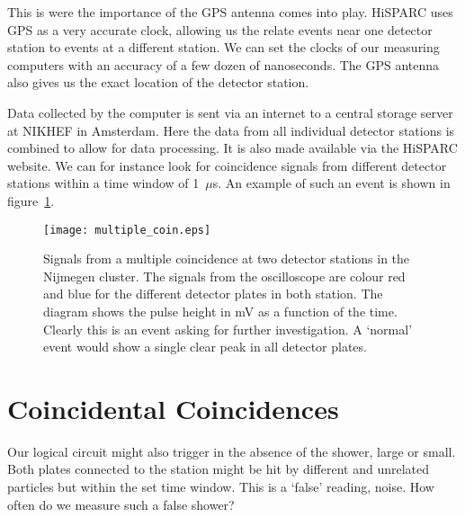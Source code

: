 This is were the importance of the GPS antenna comes into play. HiSPARC uses GPS as a very accurate clock, allowing us the relate events near one detector station to events at a different station. We can set the clocks of our measuring computers with an accuracy of a few dozen of nanoseconds. The GPS antenna also gives us the exact location of the detector station.

Data collected by the computer is sent via an internet to a central storage server at NIKHEF in Amsterdam. Here the data from all individual detector stations is combined to allow for data processing. It is also made available via the HiSPARC website. We can for instance look for coincidence signals from different detector stations within a time window of 1~$\mu$s. An example of such an event is shown in figure~\ref{fig:multiple_coin}.

\begin{figure}\begin{center}
\texttt{[image: multiple\_coin.eps]}
\caption{Signals from a multiple coincidence at two detector stations in the Nijmegen cluster. The signals from the oscilloscope are colour red and blue for the different detector plates in both station. The diagram shows the pulse height in mV as a function of the time. Clearly this is an event asking for further investigation. A `normal' event would show a single clear peak in all detector plates.\protect\footnotemark}\label{fig:multiple_coin}
\end{center}\end{figure}


\section{Coincidental Coincidences}
Our logical circuit might also trigger in the absence of the shower, large or small. Both plates connected to the station might be hit by different and unrelated particles but within the set time window. This is a `false' reading, noise. How often do we measure such a false shower?

